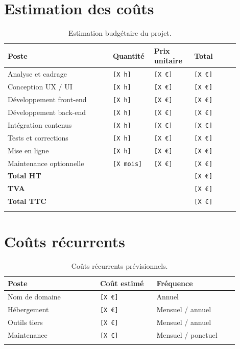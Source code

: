 \documentclass[11pt,a4paper]{report}
\newcommand{\placeholder}[1]{\textcolor{placeholderColor}{\texttt{[#1]}}}
\begin{document}
\section{Estimation des coûts}
\begin{longtable}{p{0.42\linewidth}p{0.14\linewidth}p{0.16\linewidth}p{0.18\linewidth}}
\toprule
\textbf{Poste} & \textbf{Quantité} & \textbf{Prix unitaire} & \textbf{Total} \\
\midrule
\endhead
Analyse et cadrage & \placeholder{X h} & \placeholder{X €} & \placeholder{X €} \\
Conception UX / UI & \placeholder{X h} & \placeholder{X €} & \placeholder{X €} \\
Développement front-end & \placeholder{X h} & \placeholder{X €} & \placeholder{X €} \\
Développement back-end & \placeholder{X h} & \placeholder{X €} & \placeholder{X €} \\
Intégration contenus & \placeholder{X h} & \placeholder{X €} & \placeholder{X €} \\
Tests et corrections & \placeholder{X h} & \placeholder{X €} & \placeholder{X €} \\
Mise en ligne & \placeholder{X h} & \placeholder{X €} & \placeholder{X €} \\
Maintenance optionnelle & \placeholder{X mois} & \placeholder{X €} & \placeholder{X €} \\
\midrule
\textbf{Total HT} & & & \placeholder{X €} \\
\textbf{TVA} & & & \placeholder{X €} \\
\textbf{Total TTC} & & & \placeholder{X €} \\
\bottomrule
\caption{Estimation budgétaire du projet.}
\label{tab:devis}
\end{longtable}

\section{Coûts récurrents}
\begin{longtable}{p{0.36\linewidth}p{0.22\linewidth}p{0.32\linewidth}}
\toprule
\textbf{Poste} & \textbf{Coût estimé} & \textbf{Fréquence} \\
\midrule
\endhead
Nom de domaine & \placeholder{X €} & Annuel \\
Hébergement & \placeholder{X €} & Mensuel / annuel \\
Outils tiers & \placeholder{X €} & Mensuel / annuel \\
Maintenance & \placeholder{X €} & Mensuel / ponctuel \\
\bottomrule
\caption{Coûts récurrents prévisionnels.}
\label{tab:couts-recurrents}
\end{longtable}
\end{document}
